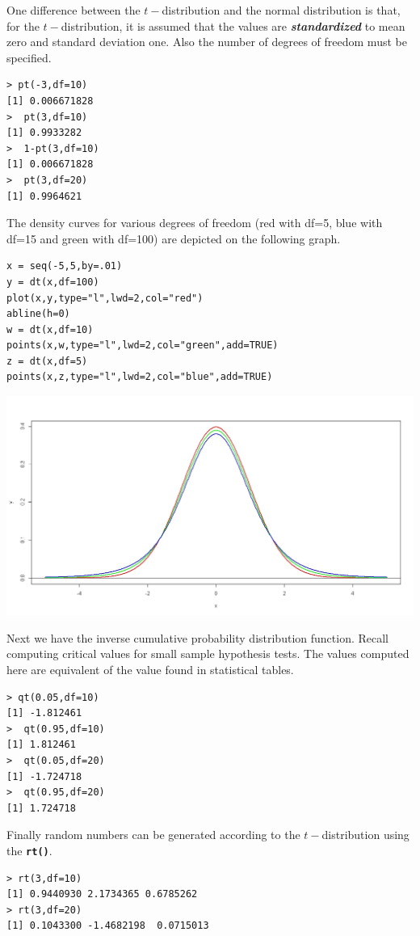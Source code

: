 \documentclass[a4paper,12pt]{article}
\begin{document}
One difference between the $t-$distribution and the normal distribution is that, for the $t-$distribution, it is assumed that the values are \textit{\textbf{standardized }}to mean zero and standard deviation one.
Also the number of degrees of freedom must be specified. 

\begin{verbatim}
> pt(-3,df=10)
[1] 0.006671828
>  pt(3,df=10)
[1] 0.9933282
>  1-pt(3,df=10)
[1] 0.006671828
>  pt(3,df=20)
[1] 0.9964621
\end{verbatim}
The density curves for various degrees of freedom (red with df=5, blue with df=15 and green with df=100) are depicted on the following graph.

\begin{verbatim}
x = seq(-5,5,by=.01)
y = dt(x,df=100) 
plot(x,y,type="l",lwd=2,col="red")
abline(h=0)
w = dt(x,df=10) 
points(x,w,type="l",lwd=2,col="green",add=TRUE)
z = dt(x,df=5) 
points(x,z,type="l",lwd=2,col="blue",add=TRUE)
\end{verbatim}

 \begin{center}
 \includegraphics[scale=0.30]{dtCurve}
 \end{center}
Next we have the inverse cumulative probability distribution function. Recall computing critical values for small sample hypothesis tests. The values computed here are equivalent of the value found in statistical tables.

\begin{verbatim}
> qt(0.05,df=10)
[1] -1.812461
>  qt(0.95,df=10)
[1] 1.812461
>  qt(0.05,df=20)
[1] -1.724718
>  qt(0.95,df=20)
[1] 1.724718
\end{verbatim}
Finally random numbers can be generated according to the $t-$distribution using the \textbf{\texttt{rt()}}.
\begin{verbatim}
> rt(3,df=10)
[1] 0.9440930 2.1734365 0.6785262
> rt(3,df=20)
[1] 0.1043300 -1.4682198  0.0715013
\end{verbatim}
\end{document}
